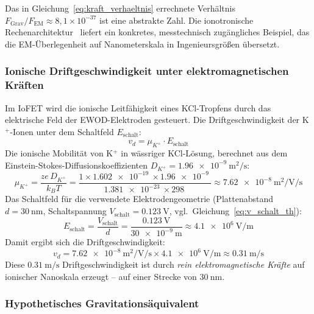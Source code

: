 ﻿\documentclass[12pt, a4paper]{report}
\theoremstyle{definition}
\theoremstyle{remark}
\begin{document}
Das in Gleichung~\eqref{eq:kraft_verhaeltnis} errechnete Verhältnis
$F_\text{Grav}/F_\text{EM} \approx 8{,}1 \times 10^{-37}$ ist eine abstrakte
Zahl. Die ionotronische Rechenarchitektur~\cite{ionotronik2026} liefert
ein konkretes, messtechnisch zugängliches Beispiel, das die EM-Überlegenheit
auf Nanometerskala in Ingenieursgrößen übersetzt.

\subsubsection{Ionische Driftgeschwindigkeit unter elektromagnetischen Kräften}

Im IoFET wird die ionische Leitfähigkeit eines KCl-Tropfens durch das
elektrische Feld der EWOD-Elektroden gesteuert. Die Driftgeschwindigkeit
der K$^+$-Ionen unter dem Schaltfeld $E_\text{schalt}$:
\begin{equation}
  v_d = \mu_{K^+} \cdot E_\text{schalt}
  \label{eq:drift_iofet}
\end{equation}
Die ionische Mobilität von K$^+$ in wässriger KCl-Lösung, berechnet aus dem
Einstein-Stokes-Diffusionskoeffizienten $D_{K^+} = \SI{1.96e-9}{\metre\squared\per\second}$:
\begin{equation}
  \mu_{K^+}
  = \frac{z e\, D_{K^+}}{k_B T}
  = \frac{1 \times \SI{1.602e-19}{} \times \SI{1.96e-9}{}}%
         {\SI{1.381e-23}{} \times \SI{298}{}}
  \approx \SI{7.62e-8}{\metre\squared\per\volt\per\second}
  \label{eq:mobilitaet_k}
\end{equation}
Das Schaltfeld für die verwendete Elektrodengeometrie
(Plattenabstand $d = \SI{30}{\nano\metre}$,
Schaltspannung $V_\text{schalt} = \SI{0.123}{\volt}$, vgl.\
Gleichung~\eqref{eq:v_schalt_th}):
\begin{equation}
  E_\text{schalt}
  = \frac{V_\text{schalt}}{d}
  = \frac{\SI{0.123}{\volt}}{\SI{30e-9}{\metre}}
  \approx \SI{4.1e6}{\volt\per\metre}
  \label{eq:feld_schalt}
\end{equation}
Damit ergibt sich die Driftgeschwindigkeit:
\begin{equation}
  v_d
  = \SI{7.62e-8}{\metre\squared\per\volt\per\second}
  \times \SI{4.1e6}{\volt\per\metre}
  \approx \SI{0.31}{\metre\per\second}
  \label{eq:vd_num}
\end{equation}
Diese $\SI{0.31}{\metre\per\second}$ Driftgeschwindigkeit ist durch
\emph{rein elektromagnetische Kräfte} auf ionischer Nanoskala erzeugt --
auf einer Strecke von $\SI{30}{\nano\metre}$.

\subsubsection{Hypothetisches Gravitationsäquivalent}
\end{document}
